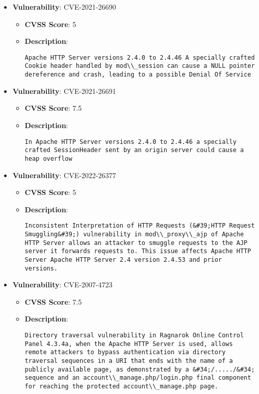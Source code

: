 \documentclass{article}
\begin{document}
\begin{itemize}
        \item \textbf{Vulnerability}: CVE-2021-26690
        \begin{itemize}
            \item \textbf{CVSS Score}:  5 
            \item \textbf{Description}:
            \parbox[t]{0.9\linewidth}{
                \verb|Apache HTTP Server versions 2.4.0 to 2.4.46 A specially crafted Cookie header handled by mod\\_session can cause a NULL pointer dereference and crash, leading to a possible Denial Of Service|
            }
        \end{itemize}
    
        \item \textbf{Vulnerability}: CVE-2021-26691
        \begin{itemize}
            \item \textbf{CVSS Score}:  7.5 
            \item \textbf{Description}:
            \parbox[t]{0.9\linewidth}{
                \verb|In Apache HTTP Server versions 2.4.0 to 2.4.46 a specially crafted SessionHeader sent by an origin server could cause a heap overflow|
            }
        \end{itemize}
    
        \item \textbf{Vulnerability}: CVE-2022-26377
        \begin{itemize}
            \item \textbf{CVSS Score}:  5 
            \item \textbf{Description}:
            \parbox[t]{0.9\linewidth}{
                \verb|Inconsistent Interpretation of HTTP Requests (&#39;HTTP Request Smuggling&#39;) vulnerability in mod\\_proxy\\_ajp of Apache HTTP Server allows an attacker to smuggle requests to the AJP server it forwards requests to. This issue affects Apache HTTP Server Apache HTTP Server 2.4 version 2.4.53 and prior versions.|
            }
        \end{itemize}
    
        \item \textbf{Vulnerability}: CVE-2007-4723
        \begin{itemize}
            \item \textbf{CVSS Score}:  7.5 
            \item \textbf{Description}:
            \parbox[t]{0.9\linewidth}{
                \verb|Directory traversal vulnerability in Ragnarok Online Control Panel 4.3.4a, when the Apache HTTP Server is used, allows remote attackers to bypass authentication via directory traversal sequences in a URI that ends with the name of a publicly available page, as demonstrated by a &#34;/...../&#34; sequence and an account\\_manage.php/login.php final component for reaching the protected account\\_manage.php page.|
            }
        \end{itemize}
    

\end{itemize}
\end{document}
